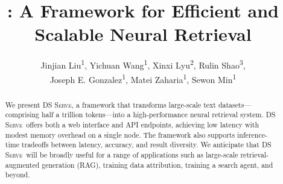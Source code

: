 \documentclass[letterpaper]{article} %
\author{
    Jinjian Liu\textsuperscript{\rm 1}\equalcontrib,
    Yichuan Wang\textsuperscript{\rm 1}\equalcontrib,
    Xinxi Lyu\textsuperscript{\rm 2},
    Rulin Shao\textsuperscript{\rm 3}, \\
    Joseph E. Gonzalez\textsuperscript{\rm 1},
    Matei Zaharia\textsuperscript{\rm 1},
    Sewon Min\textsuperscript{\rm 1}
}
\title{\sys: A Framework for Efficient and Scalable Neural Retrieval}
\newcommand{\sys}{\textsc{DS Serve\xspace}}%
\newcommand{\sewon}[1]{{\color{purple!70}[sewon: #1]}}
\newcommand{\yichuan}[1]{{\color{blue}[yichuan: #1]}}
\newcommand{\jinjian}[1]{{\color{teal}[jinjian: #1]}}
\newcommand{\sewon}[1]{}
\newcommand{\yichuan}[1]{}
\newcommand{\jinjian}[1]{}
\begin{document}
\maketitle

\begin{abstract}
We present \sys, a framework that transforms large-scale text datasets---comprising half a trillion tokens---into a high-performance neural retrieval system. \sys\ offers both a web interface and API endpoints, achieving low latency with modest memory overhead on a single node. The framework also supports inference-time tradeoffs between latency, accuracy, and result diversity. We anticipate that \sys\ will be broadly useful for a range of applications such as large-scale retrieval-augmented generation (RAG), training data attribution, training a search agent, and beyond.  






\end{abstract}
\end{document}
